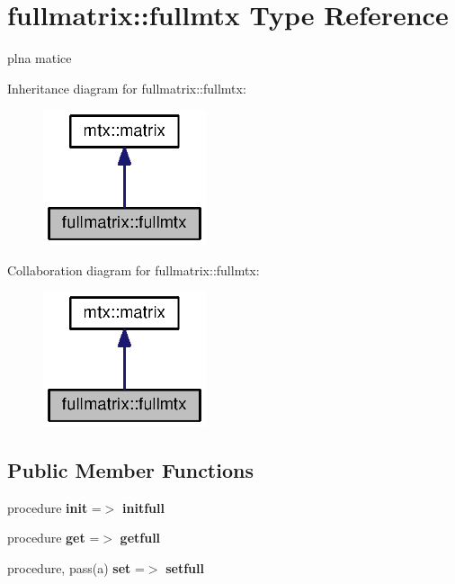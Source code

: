\section{fullmatrix\+:\+:fullmtx Type Reference}
\label{structfullmatrix_1_1fullmtx}


plna matice  




Inheritance diagram for fullmatrix\+:\+:fullmtx\+:\nopagebreak
\begin{figure}[H]
\begin{center}
\leavevmode
\includegraphics[width=136pt]{structfullmatrix_1_1fullmtx__inherit__graph}
\end{center}
\end{figure}


Collaboration diagram for fullmatrix\+:\+:fullmtx\+:\nopagebreak
\begin{figure}[H]
\begin{center}
\leavevmode
\includegraphics[width=136pt]{structfullmatrix_1_1fullmtx__coll__graph}
\end{center}
\end{figure}
\subsection*{Public Member Functions}
\begin{DoxyCompactItemize}
\item 
procedure {\bf init} =$>$ {\bf initfull}
\item 
procedure {\bf get} =$>$ {\bf getfull}
\item 
procedure, pass(a) {\bf set} =$>$ {\bf setfull}
\end{DoxyCompactItemize}
